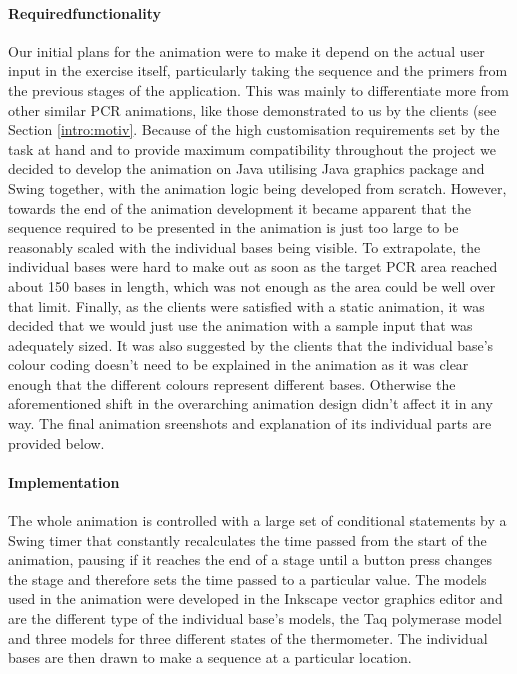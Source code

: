 \paragraph{Requiredfunctionality}
Our initial plans for the animation were to make it depend on the actual user input in the exercise itself, particularly taking the sequence and the primers from the previous stages of the application. This was mainly to differentiate more from other similar PCR animations, like those demonstrated to us by the clients (see Section \ref{intro:motiv}. Because of the high customisation requirements set by the task at hand and to provide maximum compatibility throughout the project we decided to develop the animation on Java utilising Java graphics package and Swing together, with the animation logic being developed from scratch. However, towards the end of the animation development it became apparent that the sequence required to be presented in the animation is just too large to be reasonably scaled with the individual bases being visible. To extrapolate, the individual bases were hard to make out as soon as the target PCR area reached about 150 bases in length, which was not enough as the area could be well over that limit. Finally, as the clients were satisfied with a static animation, it was decided that we would just use the animation with a sample input that  was adequately sized. It was also suggested by the clients that the individual base's colour coding doesn't need to be explained in the animation as it was clear enough that the different colours represent different bases. Otherwise the aforementioned shift in the overarching animation design didn't affect it in any way. The final animation sreenshots and explanation of its individual parts are provided below.

\paragraph{Implementation}
The whole animation is controlled with a large set of conditional statements by a Swing timer that constantly recalculates the time passed from the start of the animation, pausing if it reaches the end of a stage until a button press changes the stage and therefore sets the time passed to a particular value. The models used in the animation were developed in the Inkscape vector graphics editor and are the different type of the individual base's models, the Taq polymerase model and three models for three different states of the thermometer. The individual bases are then drawn to make a sequence at a particular location.

